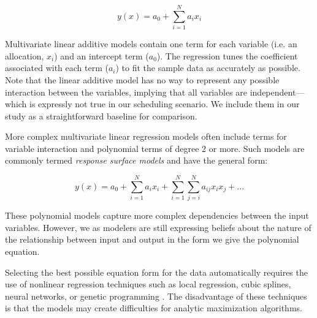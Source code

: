 \begin {equation}
y(x) = a_0 + \sum_{i=1}^{N}{a_ix_i}
\end {equation}

Multivariate linear additive models contain one term for each variable (i.e. an allocation, $x_i$) and an intercept term ($a_0$).  The regression tunes the coefficient associated with each term ($a_i$) to fit the sample data as accurately as possible.  Note that the linear additive model has no way to represent any possible interaction between the variables, implying that all variables are independent---which is expressly not true in our scheduling scenario.  We include them in our study as a straightforward baseline for comparison.

More complex multivariate linear regression models often include terms for variable interaction and polynomial terms of degree 2 or more.  Such models are commonly termed {\em response surface models} and have the general form:

\begin {equation}
y(x) = a_0 + \sum_{i=1}^{N}{a_ix_i} + \sum_{i = 1}^{N}\sum_{j=i}^{N}{a_{ij}x_ix_j} + ...
\end {equation}

These polynomial models capture more complex dependencies between the input variables.  However, we as modelers are still expressing beliefs about the nature of the relationship between input and output in the form we give the polynomial equation.

Selecting the best possible equation form for the data automatically requires the use of nonlinear regression techniques such as local regression, cubic splines, neural networks, or genetic programming \cite{alvarez-thesis, bodik-acdc09, wasserman-book}.  The disadvantage of these techniques is that the models may create difficulties for analytic maximization algorithms.

